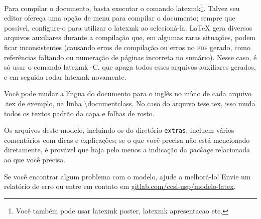 Para compilar o documento, basta executar o comando
\textsf{latexmk}\footnote{Você também pode usar \textsf{latexmk poster},
\textsf{latexmk apresentacao} etc.}. Talvez seu editor ofereça uma opção
de menu para compilar o documento; sempre que possível, configure-o para
utilizar o \textsf{latexmk} ao selecioná-la. \LaTeX{} gera diversos arquivos
auxiliares durante a compilação que, em algumas raras situações, podem ficar
inconsistentes (causando erros de compilação ou erros no \textsc{pdf} gerado,
como referências faltando ou numeração de páginas incorreta no sumário).
Nesse caso, é só usar o comando \textsf{latexmk -C}, que apaga todos esses
arquivos auxiliares gerados, e em seguida rodar \textsf{latexmk} novamente.

Você pode mudar a língua do documento para o inglês no início de cada
arquivo .tex de exemplo, na linha \textsf{\textbackslash{}documentclass}.
No caso do arquivo \textsf{tese.tex}, isso muda todos os textos padrão
da capa e folhas de rosto.

Os arquivos deste modelo, incluindo os do diretório \texttt{extras},
incluem vários comentários com dicas e explicações; se o que você precisa
não está mencionado diretamente, é provável que haja pelo menos a indicação
da \textit{package} relacionada ao que você precisa.

Se você encontrar algum problema com o modelo, ajude a melhorá-lo!
Envie um relatório de erro ou entre em contato em
\url{gitlab.com/ccsl-usp/modelo-latex}.
